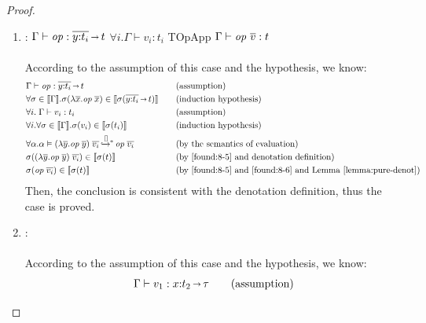 \begin{proof}
\begin{enumerate}[label=Case]
{\begin{alignat}{2}
  \end{alignat}}\noindent
Then, the conclusion is consistent with the denotation definition, thus the case is proved.
\item:
{\footnotesize
\mprooftr{52mm}
{
$\Gamma \vdash \mathit{op} : \overline{y{:}t_i}{\,\shortrightarrow\,} t$ \quad
$\forall i. \Gamma \vdash v_i : t_i$
}
{TOpApp}
{$\Gamma\vdash \mathit{op}\ \overline{v} : t$}
\ \\ \ \\}
According to the assumption of this case and the hypothesis, we know:
{\footnotesize\begin{alignat}{2}
  \setcounter{equation}{0}
  &\Gamma \vdash \primop : \overline{y{:}t_i}\sarr t \ptag{assumption} \label{found:8-1} \\
  &\forall \sigma \in \denot{\Gamma}. \sigma(\lambda \overline{x}.\primop\;\overline{x}) \in \denot{\sigma(\overline{y{:}t_i}\sarr t)} \ptag{induction hypothesis} \label{found:8-2} \\
  &\forall i. \;\Gamma \vdash v_i : t_i \ptag{assumption} \label{found:8-3} \\
  &\forall i.\forall \sigma \in \denot{\Gamma}. \sigma(v_i) \in \denot{\sigma(t_i)} \ptag{induction hypothesis} \label{found:8-4} \\
  &\forall \alpha. \msteptr{\alpha}{(\lambda \overline{y}.\primop\;\overline{y}) \; \overline{v_i}}{[]}{\primop\; \overline{v_i}}\ptag{by the semantics of evaluation} \label{found:8-5} \\
  &\sigma((\lambda \overline{y}.\primop\;\overline{y}) \; \overline{v_i}) \in \denot{\sigma(t)} \ptag{by  \ref{found:8-5} and denotation definition} \label{found:8-6} \\
  &\sigma(\primop\; \overline{v_i}) \in \denot{\sigma(t)} \ptag{by \ref{found:8-5} and \ref{found:8-6} and Lemma~\ref{lemma:pure-denot}} \label{found:8-7}
  \end{alignat}}\noindent
Then, the conclusion is consistent with the denotation definition, thus the case is proved.
\item:
{\footnotesize
{}
\ \\ \ \\}
According to the assumption of this case and the hypothesis, we know:
{\footnotesize\begin{alignat}{2}
  \setcounter{equation}{0}
  &\Gamma \vdash v_1 : x{:}t_2 \sarr \tau \ptag{assumption} \label{found:9-1} \\

\end{alignat}}
\end{enumerate}
\end{proof}
